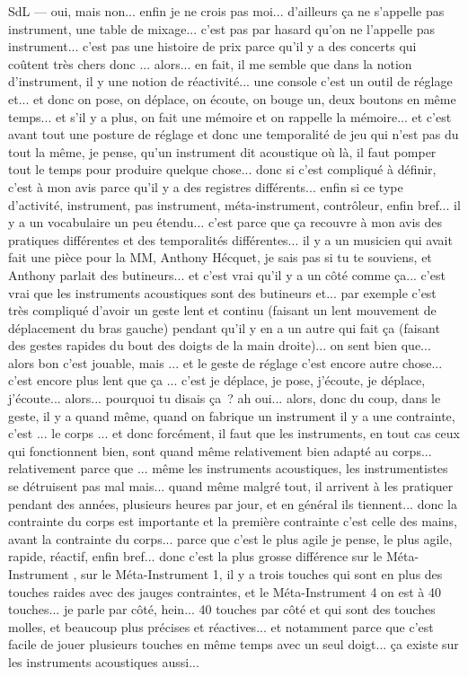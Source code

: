 SdL — oui, mais non... enfin je ne crois pas moi... d'ailleurs ça ne s'appelle pas instrument, une table de mixage... c'est pas par hasard qu'on ne l'appelle pas instrument... c'est pas une histoire de prix parce qu'il y a des concerts qui coûtent très chers donc ... alors... en fait, il me semble que dans la notion d'instrument, il y une notion de réactivité... une console c'est un outil de réglage et... et donc on pose, on déplace, on écoute, on bouge un, deux boutons en même temps... et s'il y a plus, on fait une mémoire et on rappelle la mémoire... et c'est avant tout une posture de réglage et donc une temporalité de jeu qui n'est pas du tout la même, je pense, qu'un instrument dit acoustique où là, il faut pomper tout le temps pour produire quelque chose... donc si c'est compliqué à définir, c'est à mon avis parce qu'il y a des registres différents... enfin si ce type d'activité, instrument, pas instrument, méta-instrument, contrôleur, enfin bref... il y a un vocabulaire un peu étendu... c'est parce que ça recouvre à mon avis des pratiques différentes et des temporalités différentes... il y a un musicien qui avait fait une pièce pour la MM, Anthony Hécquet, je sais pas si tu te souviens, et Anthony parlait des butineurs... et c'est vrai qu'il y a un côté comme ça... c'est vrai que les instruments acoustiques sont des butineurs et... par exemple c'est très compliqué d'avoir un geste lent et continu (faisant un lent mouvement de déplacement du bras gauche) pendant qu'il y en a un autre qui fait ça (faisant des gestes rapides du bout des doigts de la main droite)... on sent bien que... alors bon c'est jouable, mais ... et le geste de réglage c'est encore autre chose... c'est encore plus lent que ça ... c'est je déplace, je pose, j'écoute, je déplace, j'écoute... alors... pourquoi tu disais ça ? ah oui... alors, donc du coup, dans le geste, il y a quand même, quand on fabrique un instrument il y a une contrainte, c'est ... le corps ... et donc forcément, il faut que les instruments, en tout cas ceux qui fonctionnent bien, sont quand même relativement bien adapté au corps... relativement parce que ... même les instruments acoustiques, les instrumentistes se détruisent pas mal mais... quand même malgré tout, il arrivent à les pratiquer pendant des années, plusieurs heures par jour, et en général ils tiennent... donc la contrainte du corps est importante et la première contrainte c'est celle des mains, avant la contrainte du corps... parce que c'est le plus agile je pense, le plus agile, rapide, réactif, enfin bref... donc c'est la plus grosse différence sur le Méta-Instrument , sur le Méta-Instrument 1, il y a trois touches qui sont en plus des touches raides avec des jauges contraintes, et le Méta-Instrument 4 on est à 40 touches... je parle par côté, hein... 40 touches par côté et qui sont des touches molles, et beaucoup plus précises et réactives... et notamment parce que c'est facile de jouer plusieurs touches en même temps avec un seul doigt... ça existe sur les instruments acoustiques aussi... 

